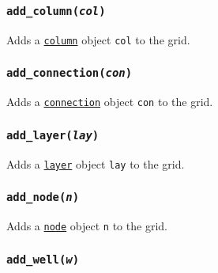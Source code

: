 \begin{snugshade}\subsubsection{\texttt{add\_column(\emph{col})}}\end{snugshade}
\label{sec:mulgrid:add_column}

Adds a \hyperref[columnobjects]{\texttt{column}} object \texttt{col} to the grid.

\begin{snugshade}\subsubsection{\texttt{add\_connection(\emph{con})}}\end{snugshade}
\label{sec:mulgrid:add_connection}

Adds a \hyperref[connectionobjects]{\texttt{connection}} object \texttt{con} to the grid.

\begin{snugshade}\subsubsection{\texttt{add\_layer(\emph{lay})}}\end{snugshade}
\label{sec:mulgrid:add_layer}

Adds a \hyperref[layerobjects]{\texttt{layer}} object \texttt{lay} to the grid.

\begin{snugshade}\subsubsection{\texttt{add\_node(\emph{n})}}\end{snugshade}
\label{sec:mulgrid:add_node}

Adds a \hyperref[nodeobjects]{\texttt{node}} object \texttt{n} to the grid.

\begin{snugshade}\subsubsection{\texttt{add\_well(\emph{w})}}\end{snugshade}
\label{sec:mulgrid:add_well}

